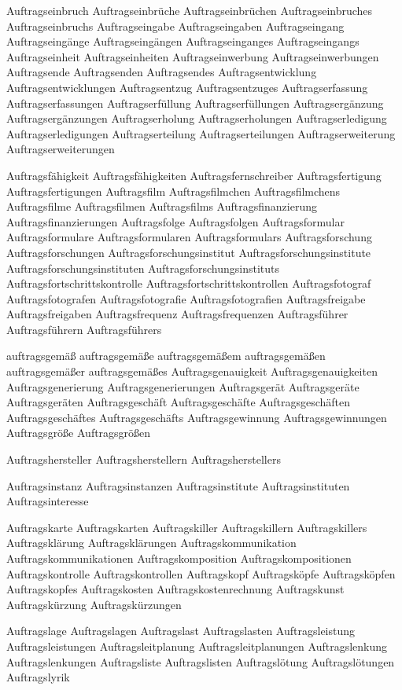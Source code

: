 Auftragseinbruch
Auftragseinbrüche
Auftragseinbrüchen
Auftragseinbruches
Auftragseinbruchs
Auftragseingabe
Auftragseingaben
Auftragseingang
Auftragseingänge
Auftragseingängen
Auftragseinganges
Auftragseingangs
Auftragseinheit
Auftragseinheiten
Auftragseinwerbung
Auftragseinwerbungen
Auftragsende
Auftragsenden
Auftragsendes
Auftragsentwicklung
Auftragsentwicklungen
Auftragsentzug
Auftragsentzuges
Auftragserfassung
Auftragserfassungen
Auftragserfüllung
Auftragserfüllungen
Auftragsergänzung
Auftragsergänzungen
Auftragserholung
Auftragserholungen
Auftragserledigung
Auftragserledigungen
Auftragserteilung
Auftragserteilungen
Auftragserweiterung
Auftragserweiterungen

Auftragsfähigkeit
Auftragsfähigkeiten
Auftragsfernschreiber
Auftragsfertigung
Auftragsfertigungen
Auftragsfilm
Auftragsfilmchen
Auftragsfilmchens
Auftragsfilme
Auftragsfilmen
Auftragsfilms
Auftragsfinanzierung
Auftragsfinanzierungen
Auftragsfolge
Auftragsfolgen
Auftragsformular
Auftragsformulare
Auftragsformularen
Auftragsformulars
Auftragsforschung
Auftragsforschungen
Auftragsforschungsinstitut
Auftragsforschungsinstitute
Auftragsforschungsinstituten
Auftragsforschungsinstituts
Auftragsfortschrittskontrolle
Auftragsfortschrittskontrollen
Auftragsfotograf
Auftragsfotografen
Auftragsfotografie
Auftragsfotografien
Auftragsfreigabe
Auftragsfreigaben
Auftragsfrequenz
Auftragsfrequenzen
Auftragsführer
Auftragsführern
Auftragsführers

auftragsgemäß
auftragsgemäße
auftragsgemäßem
auftragsgemäßen
auftragsgemäßer
auftragsgemäßes
Auftragsgenauigkeit
Auftragsgenauigkeiten
Auftragsgenerierung
Auftragsgenerierungen
Auftragsgerät
Auftragsgeräte
Auftragsgeräten
Auftragsgeschäft
Auftragsgeschäfte
Auftragsgeschäften
Auftragsgeschäftes
Auftragsgeschäfts
Auftragsgewinnung
Auftragsgewinnungen
Auftragsgröße
Auftragsgrößen

Auftragshersteller
Auftragsherstellern
Auftragsherstellers

Auftragsinstanz
Auftragsinstanzen
Auftragsinstitute
Auftragsinstituten
Auftragsinteresse

Auftragskarte
Auftragskarten
Auftragskiller
Auftragskillern
Auftragskillers
Auftragsklärung
Auftragsklärungen
Auftragskommunikation
Auftragskommunikationen
Auftragskomposition
Auftragskompositionen
Auftragskontrolle
Auftragskontrollen
Auftragskopf
Auftragsköpfe
Auftragsköpfen
Auftragskopfes
Auftragskosten
Auftragskostenrechnung
Auftragskunst
Auftragskürzung
Auftragskürzungen

Auftragslage
Auftragslagen
Auftragslast
Auftragslasten
Auftragsleistung
Auftragsleistungen
Auftragsleitplanung
Auftragsleitplanungen
Auftragslenkung
Auftragslenkungen
Auftragsliste
Auftragslisten
Auftragslötung
Auftragslötungen
Auftragslyrik

